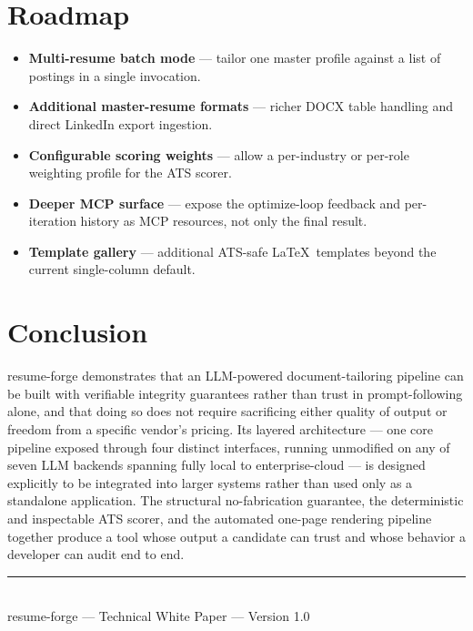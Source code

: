 \documentclass[10.5pt,letterpaper]{article}
\begin{document}
\newpage

\section{Roadmap}

\begin{itemize}
  \item \textbf{Multi-resume batch mode} --- tailor one master profile against a list of
    postings in a single invocation.
  \item \textbf{Additional master-resume formats} --- richer DOCX table handling and direct
    LinkedIn export ingestion.
  \item \textbf{Configurable scoring weights} --- allow a per-industry or per-role weighting
    profile for the ATS scorer.
  \item \textbf{Deeper MCP surface} --- expose the optimize-loop feedback and per-iteration
    history as MCP resources, not only the final result.
  \item \textbf{Template gallery} --- additional ATS-safe \LaTeX\ templates beyond the current
    single-column default.
\end{itemize}

\vspace{0.6cm}
\section{Conclusion}

resume-forge demonstrates that an LLM-powered document-tailoring pipeline can be built with
verifiable integrity guarantees rather than trust in prompt-following alone, and that doing
so does not require sacrificing either quality of output or freedom from a specific vendor's
pricing. Its layered architecture --- one core pipeline exposed through four distinct
interfaces, running unmodified on any of seven LLM backends spanning fully local to
enterprise-cloud --- is designed explicitly to be integrated into larger systems rather than
used only as a standalone application. The structural no-fabrication guarantee, the
deterministic and inspectable ATS scorer, and the automated one-page rendering pipeline
together produce a tool whose output a candidate can trust and whose behavior a developer can
audit end to end.

\vspace{1.2cm}
\begin{center}
\rule{0.5\textwidth}{0.4pt}\\[0.3cm]
{\small\color{brandSlateLight}\textsf{resume-forge --- Technical White Paper --- Version 1.0}}
\end{center}
\end{document}
